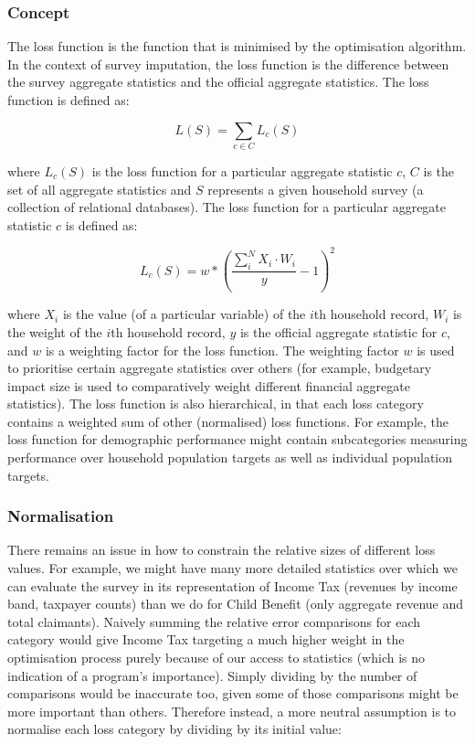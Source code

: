 \documentclass[10pt,journal,compsoc]{IEEEtran}
\begin{document}
\subsubsection{Concept}

The loss function is the function that is minimised by the optimisation algorithm. In the context of survey imputation, the loss function is the difference between the survey aggregate statistics and the official aggregate statistics. The loss function is defined as:

\begin{equation}
  L(S) = \sum_{c \in C} L_c(S)
\end{equation}

where $L_c(S)$ is the loss function for a particular aggregate statistic $c$, $C$ is the set of all aggregate statistics and $S$ represents a given household survey (a collection of relational databases). The loss function for a particular aggregate statistic $c$ is defined as:

\begin{equation}
  L_c(S) = w * (\frac{\sum_i^{N} X_i \cdot W_i}{y} - 1) ^ 2
\end{equation}

where $X_i$ is the value (of a particular variable) of the $i$th household record, $W_i$ is the weight of the $i$th household record, $y$ is the official aggregate statistic for $c$, and $w$ is a weighting factor for the loss function. The weighting factor $w$ is used to prioritise certain aggregate statistics over others (for example, budgetary impact size is used to comparatively weight different financial aggregate statistics). The loss function is also hierarchical, in that each loss category contains a weighted sum of other (normalised) loss functions. For example, the loss function for demographic performance might contain subcategories measuring performance over household population targets as well as individual population targets.

\subsubsection{Normalisation} There remains an issue in how to constrain the relative sizes of different loss values. For example, we might have many more detailed statistics over which we can evaluate the survey in its representation of Income Tax (revenues by income band, taxpayer counts) than we do for Child Benefit (only aggregate revenue and total claimants). Naively summing the relative error comparisons for each category would give Income Tax targeting a much higher weight in the optimisation process purely because of our access to statistics (which is no indication of a program's importance). Simply dividing by the number of comparisons would be inaccurate too, given some of those comparisons might be more important than others. Therefore instead, a more neutral assumption is to normalise each loss category by dividing by its initial value:
\end{document}
